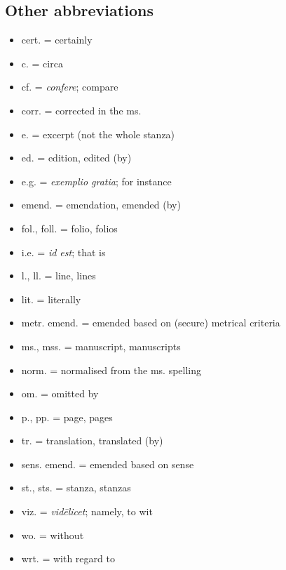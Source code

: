 \subsection{Other abbreviations}
\begin{itemize}%
	\item cert. = certainly
	\item c. = circa
	\item cf. = \emph{confere}; compare
	\item corr. = corrected in the ms.
	\item e. = excerpt (not the whole stanza)
	\item ed. = edition, edited (by)
	\item e.g. = \emph{exemplio gratia}; for instance
	\item emend. = emendation, emended (by)
	\item fol., foll. = folio, folios
	\item i.e. = \emph{id est}; that is
	\item l., ll. = line, lines
	\item lit. = literally
	\item metr. emend. = emended based on (secure) metrical criteria
	\item ms., mss. = manuscript, manuscripts
	\item norm. = normalised from the ms. spelling
	\item om. = omitted by
	\item p., pp. = page, pages
	\item tr. = translation, translated (by)
	\item sens. emend. = emended based on sense
	\item st., sts. = stanza, stanzas
	\item viz. = \emph{vidēlicet}; namely, to wit
	\item wo. = without
	\item wrt. = with regard to
\end{itemize}

